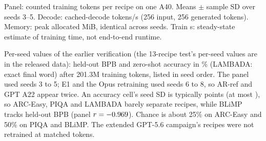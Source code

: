 \documentclass{article}
\begin{document}
\begin{table}[H]
\caption{Panel: \CRPanelBudget{} counted training tokens per recipe on one A40. Means $\pm$ sample SD over seeds 3--5. Decode: cached-decode tokens/s (256 input, 256 generated tokens). Memory: peak allocated MiB, identical across seeds. Train s: steady-state estimate of training time, not end-to-end runtime.}\label{tab:main}
\centering\footnotesize\setlength{\tabcolsep}{4pt}
\end{table}
\begin{table}[H]
\caption{Per-seed values of the earlier verification (the 13-recipe test's per-seed values are in the released data): held-out BPB and zero-shot accuracy in \% (LAMBADA: exact final word) after 201.3M training tokens, listed in seed order. The panel used seeds 3 to 5; E1 and the Opus retraining used seeds 6 to 8, so AR-ref and GPT A22 appear twice. An accuracy cell's seed SD is typically \CRNineBenchSDMed{} points (at most \CRNineBenchSDMax), so ARC-Easy, PIQA and LAMBADA barely separate recipes, while BLiMP tracks held-out BPB (panel $r=\CRCorrBLiMPHeld$). Chance is about 25\% on ARC-Easy and 50\% on PIQA and BLiMP. The extended GPT-5.6 campaign's recipes were not retrained at matched tokens.}\label{tab:benchseeds}
\centering\scriptsize\setlength{\tabcolsep}{3pt}
\end{table}
\end{document}
